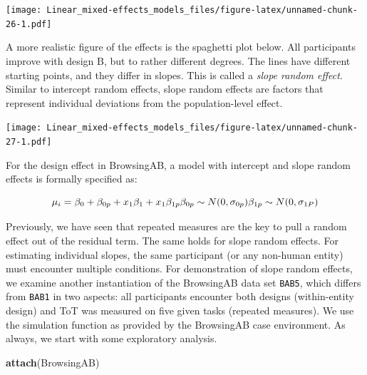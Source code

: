 \documentclass[]{svmono}
\newenvironment{Shaded}{\begin{snugshade}}{\end{snugshade}}
\newcommand{\KeywordTok}[1]{\textcolor[rgb]{0.13,0.29,0.53}{\textbf{#1}}}
\newcommand{\DataTypeTok}[1]{\textcolor[rgb]{0.13,0.29,0.53}{#1}}
\newcommand{\DecValTok}[1]{\textcolor[rgb]{0.00,0.00,0.81}{#1}}
\newcommand{\StringTok}[1]{\textcolor[rgb]{0.31,0.60,0.02}{#1}}
\newcommand{\OperatorTok}[1]{\textcolor[rgb]{0.81,0.36,0.00}{\textbf{#1}}}
\newcommand{\NormalTok}[1]{#1}
\theoremstyle{definition}
\theoremstyle{definition}
\theoremstyle{definition}
\theoremstyle{remark}
\begin{document}
\texttt{[image: Linear\_mixed-effects\_models\_files/figure-latex/unnamed-chunk-26-1.pdf]}

A more realistic figure of the effects is the spaghetti plot below. All
participants improve with design B, but to rather different degrees. The
lines have different starting points, and they differ in slopes. This is
called a \emph{slope random effect}. Similar to intercept random
effects, slope random effects are factors that represent individual
deviations from the population-level effect.

\begin{Shaded}
\end{Shaded}

\texttt{[image: Linear\_mixed-effects\_models\_files/figure-latex/unnamed-chunk-27-1.pdf]}

For the design effect in BrowsingAB, a model with intercept and slope
random effects is formally specified as:

\[
\mu_i = \beta_0 + \beta_{0p} + x_1\beta_1 + x_{1}\beta_{1p}\\
\beta_{0p} \sim N(0,\sigma_{0p})\\
\beta_{1p} \sim N(0,\sigma_{1P})
\]

Previously, we have seen that repeated measures are the key to pull a
random effect out of the residual term. The same holds for slope random
effects. For estimating individual slopes, the same participant (or any
non-human entity) must encounter multiple conditions. For demonstration
of slope random effects, we examine another instantiation of the
BrowsingAB data set \texttt{BAB5}, which differs from \texttt{BAB1} in
two aspects: all participants encounter both designs (within-entity
design) and ToT was measured on five given tasks (repeated measures). We
use the simulation function as provided by the BrowsingAB case
environment. As always, we start with some exploratory analysis.

\begin{Shaded}
\begin{Highlighting}[]
\KeywordTok{attach}\NormalTok{(BrowsingAB)}
\end{Highlighting}
\end{Shaded}
\end{document}
